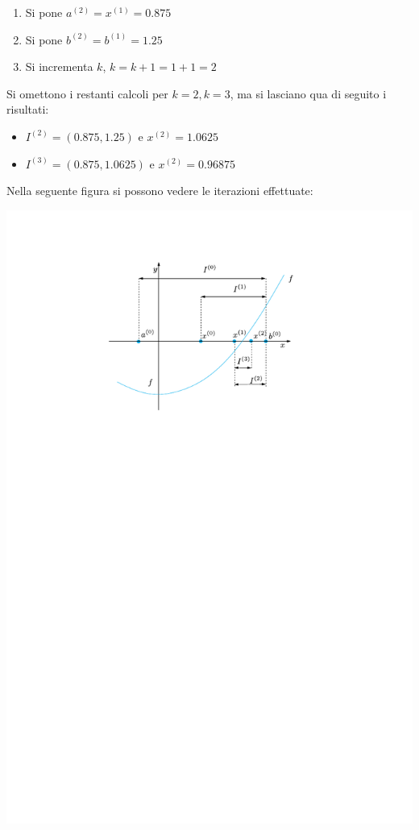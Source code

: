 \documentclass[a4paper]{article}
\begin{document}
\begin{examplebox}
\begin{enumerate}
\begin{enumerate}
                \item Si pone $a^{(2)} = x^{(1)} = 0.875$

                \item Si pone $b^{(2)} = b^{(1)} = 1.25$

                \item Si incrementa $k$, $k = k + 1 = 1 + 1 = 2$
            \end{enumerate}
        \end{enumerate}
        Si omettono i restanti calcoli per $k=2, k=3$, ma si lasciano qua di seguito i risultati:
        \begin{itemize}
            \item $I^{(2)} = \left(0.875, 1.25\right)$ e $x^{(2)} = 1.0625$
            \item $I^{(3)} = \left(0.875, 1.0625\right)$ e $x^{(2)} = 0.96875$
        \end{itemize}

        \newpage

        \noindent
        Nella seguente figura si possono vedere le iterazioni effettuate:
        \begin{center}
            \includegraphics[width=.7\textwidth]{img/metodo-di-bisezione-1.pdf}
        \end{center}
    \end{examplebox}

    \newpage

    {}
    

    \newpage

    \printindex
\end{document}
